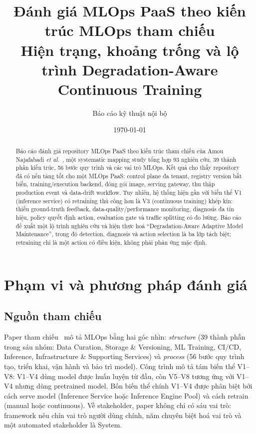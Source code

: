 \documentclass[11pt,a4paper]{article}
\title{\textbf{Đánh giá MLOps PaaS theo kiến trúc MLOps tham chiếu}\\
\large Hiện trạng, khoảng trống và lộ trình Degradation-Aware Continuous Training}
\author{Báo cáo kỹ thuật nội bộ}
\date{\today}
\begin{document}
\maketitle

\begin{abstract}
Báo cáo đánh giá repository MLOps PaaS theo kiến trúc tham chiếu của Amou Najafabadi \textit{et al.}~\cite{najafabadi2026}, một systematic mapping study tổng hợp 93 nghiên cứu, 39 thành phần kiến trúc, 56 bước quy trình và các vai trò MLOps. Kết quả cho thấy repository đã có nền tảng tốt cho một MLOps PaaS: control plane đa tenant, registry version bất biến, training/execution backend, đóng gói image, serving gateway, thu thập production event và data-drift workflow. Tuy nhiên, hệ thống hiện gần với biến thể V1 (inference service) có retraining thủ công hơn là V3 (continuous training) khép kín: thiếu ground-truth feedback, data-quality/performance monitoring, diagnosis đa tín hiệu, policy quyết định action, evaluation gate và traffic splitting có đo lường. Báo cáo đề xuất một lộ trình nghiên cứu và hiện thực hoá ``Degradation-Aware Adaptive Model Maintenance'', trong đó detection, diagnosis và action selection là ba lớp tách biệt; retraining chỉ là một action có điều kiện, không phải phản ứng mặc định.
\end{abstract}

\section{Phạm vi và phương pháp đánh giá}

\subsection{Nguồn tham chiếu}
Paper tham chiếu~\cite{najafabadi2026} mô tả MLOps bằng hai góc nhìn: \emph{structure} (39 thành phần trong sáu nhóm: Data Curation, Storage \& Versioning, ML Training, CI/CD, Inference, Infrastructure \& Supporting Services) và \emph{process} (56 bước quy trình tạo, triển khai, vận hành và bảo trì model). Công trình mô tả tám biến thể V1--V8: V1--V4 dùng model được huấn luyện từ đầu, còn V5--V8 tương ứng với V1--V4 nhưng dùng pretrained model. Bốn biến thể chính V1--V4 được phân biệt bởi cách serve model (Inference Service hoặc Inference Engine Pool) và cách retrain (manual hoặc continuous). Về stakeholder, paper không chỉ có sáu vai trò: framework nêu chín vai trò người dùng chính, năm chuyên biệt hoá vai trò và một automated stakeholder là System.
\end{document}
